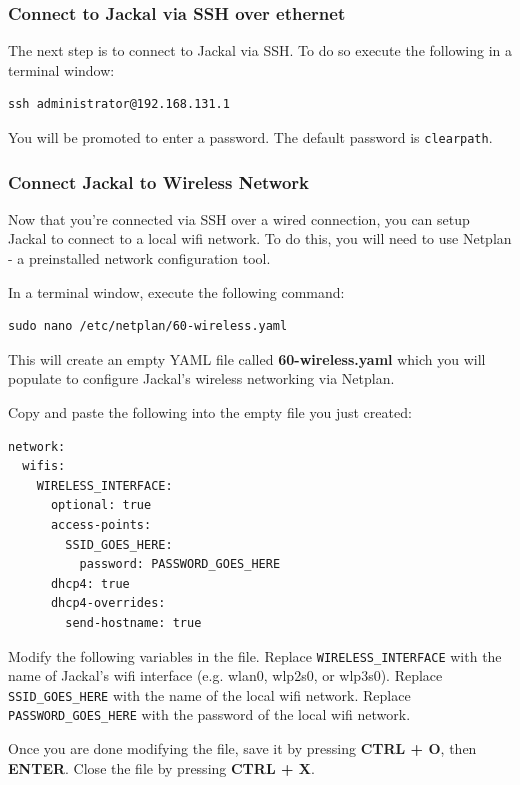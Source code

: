 \documentclass[]{clearpath-latex/clearpath-manual}
\begin{document}
\subsubsection{Connect to Jackal via SSH over ethernet}

The next step is to connect to Jackal via SSH.  To do so execute the following in a terminal window:

\begin{lstlisting}
ssh administrator@192.168.131.1
\end{lstlisting}

You will be promoted to enter a password.  The default password is \lstinline{clearpath}.

\subsubsection{Connect Jackal to Wireless Network}

Now that you're connected via SSH over a wired connection, you can setup Jackal to connect to a local wifi network. To do this, you will need to use Netplan - a preinstalled network configuration tool.

In a terminal window, execute the following command:

\begin{lstlisting}
sudo nano /etc/netplan/60-wireless.yaml
\end{lstlisting}

This will create an empty YAML file called \textbf{60-wireless.yaml} which you will populate to configure Jackal's wireless networking via Netplan.

Copy and paste the following into the empty file you just created:

\begin{lstlisting}
network:
  wifis:
    WIRELESS_INTERFACE:
      optional: true
      access-points:
        SSID_GOES_HERE:
          password: PASSWORD_GOES_HERE
      dhcp4: true
      dhcp4-overrides:
        send-hostname: true
\end{lstlisting}

Modify the following variables in the file. Replace \lstinline{WIRELESS_INTERFACE} with the name of Jackal's wifi interface (e.g. wlan0, wlp2s0, or wlp3s0). Replace \lstinline{SSID_GOES_HERE} with the name of the local wifi network. Replace \lstinline{PASSWORD_GOES_HERE} with the password of the local wifi network. 

Once you are done modifying the file, save it by pressing \textbf{CTRL + O}, then \textbf{ENTER}. Close the file by pressing \textbf{CTRL + X}.
\end{document}

